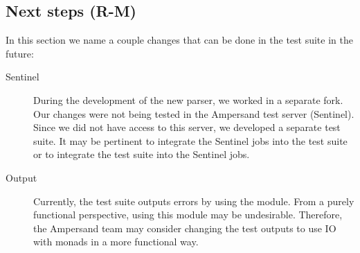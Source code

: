 
\subsection{Next steps (R-M)}
\label{recommendations:tests}
  In this section we name a couple changes that can be done in the test suite in the future:
  \begin{description}
    \item[Sentinel] During the development of the new parser, we worked in a separate fork.
      Our changes were not being tested in the Ampersand test server (Sentinel).
      Since we did not have access to this server, we developed a separate test suite.
      It may be pertinent to integrate the Sentinel jobs into the test suite or to integrate the test suite into the Sentinel jobs.
    
    \item[Output] Currently, the test suite outputs errors by using the  module.
      From a purely functional perspective, using this module may be undesirable.
      Therefore, the Ampersand team may consider changing the test outputs to use IO with monads in a more functional way.
  \end{description}
